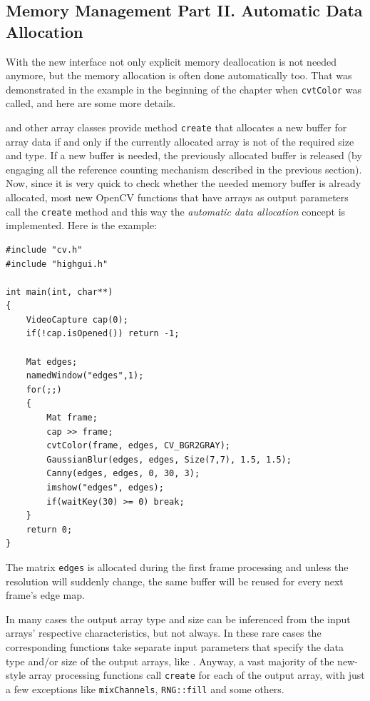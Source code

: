 \subsection{Memory Management Part II. Automatic Data Allocation}\label{AutomaticMemoryManagement2}

With the new interface not only explicit memory deallocation is not needed anymore,
but the memory allocation is often done automatically too. That was demonstrated in the example
in the beginning of the chapter when \texttt{cvtColor} was called, and here are some more details.

 and other array classes provide method \texttt{create} that allocates a new buffer for array
data if and only if the currently allocated array is not of the required size and type.
If a new buffer is needed, the previously allocated buffer is released
(by engaging all the reference counting mechanism described in the previous section).
Now, since it is very quick to check whether the needed memory buffer is already allocated,
most new OpenCV functions that have arrays as output parameters call the \texttt{create} method and
this way the \emph{automatic data allocation} concept is implemented. Here is the example:
\begin{lstlisting}
#include "cv.h"
#include "highgui.h"

int main(int, char**)
{
    VideoCapture cap(0);
    if(!cap.isOpened()) return -1;

    Mat edges;
    namedWindow("edges",1);
    for(;;)
    {
        Mat frame;
        cap >> frame;
        cvtColor(frame, edges, CV_BGR2GRAY);
        GaussianBlur(edges, edges, Size(7,7), 1.5, 1.5);
        Canny(edges, edges, 0, 30, 3);
        imshow("edges", edges);
        if(waitKey(30) >= 0) break;
    }
    return 0;
}
\end{lstlisting}
The matrix \texttt{edges} is allocated during the first frame processing and unless the resolution will suddenly change,
the same buffer will be reused for every next frame's edge map.

In many cases the output array type and size can be inferenced from the input arrays' respective characteristics, but not always.
In these rare cases the corresponding functions take separate input parameters that specify the data type and/or size of the output arrays,
like . Anyway, a vast majority of the new-style array processing functions call \texttt{create}
for each of the output array, with just a few exceptions like \texttt{mixChannels}, \texttt{RNG::fill} and some others.

